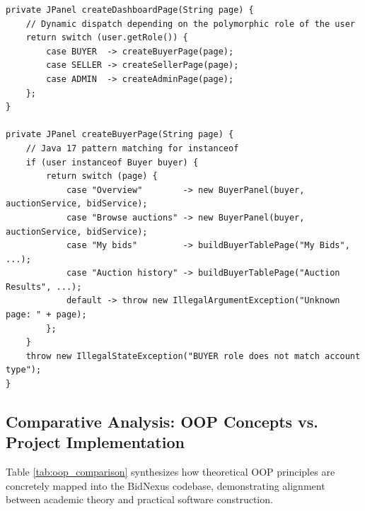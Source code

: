 \begin{lstlisting}[caption={Polymorphic Dashboard Page Dispatch in \texttt{DashboardFrame.java}}, label={lst:dashboard_polymorphism}]
private JPanel createDashboardPage(String page) {
    // Dynamic dispatch depending on the polymorphic role of the user
    return switch (user.getRole()) {
        case BUYER  -> createBuyerPage(page);
        case SELLER -> createSellerPage(page);
        case ADMIN  -> createAdminPage(page);
    };
}

private JPanel createBuyerPage(String page) {
    // Java 17 pattern matching for instanceof
    if (user instanceof Buyer buyer) {
        return switch (page) {
            case "Overview"        -> new BuyerPanel(buyer, auctionService, bidService);
            case "Browse auctions" -> new BuyerPanel(buyer, auctionService, bidService);
            case "My bids"         -> buildBuyerTablePage("My Bids", ...);
            case "Auction history" -> buildBuyerTablePage("Auction Results", ...);
            default -> throw new IllegalArgumentException("Unknown page: " + page);
        };
    }
    throw new IllegalStateException("BUYER role does not match account type");
}
\end{lstlisting}

\subsection{Comparative Analysis: OOP Concepts vs. Project Implementation}
Table \ref{tab:oop_comparison} synthesizes how theoretical OOP principles are concretely mapped into the BidNexus codebase, demonstrating alignment between academic theory and practical software construction.

